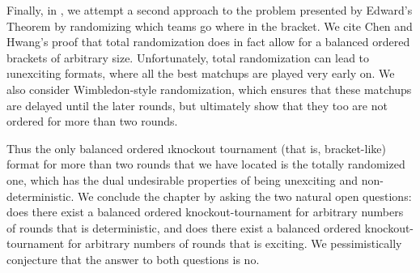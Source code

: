 {    Finally, in , we attempt a second approach to the problem presented by Edward's Theorem by randomizing which teams go where in the bracket. We cite Chen and Hwang's \cite{totally_random_balanced} proof that total randomization does in fact allow for a balanced ordered brackets of arbitrary size. Unfortunately, total randomization can lead to \i{unexciting} formats, where all the best matchups are played very early on. We also consider Wimbledon-style randomization, which ensures that these matchups are delayed until the later rounds, but ultimately show that they too are not ordered for more than two rounds.

    Thus the only balanced ordered \i{knockout tournament} (that is, bracket-like) format for more than two rounds that we have located is the totally randomized one, which has the dual undesirable properties of being unexciting and non-deterministic. We conclude the chapter by asking the two natural open questions: does there exist a balanced ordered knockout-tournament for arbitrary numbers of rounds that is deterministic, and does there exist a balanced ordered knockout-tournament for arbitrary numbers of rounds that is exciting. We pessimistically conjecture that the answer to both questions is no.

    
    

    }









